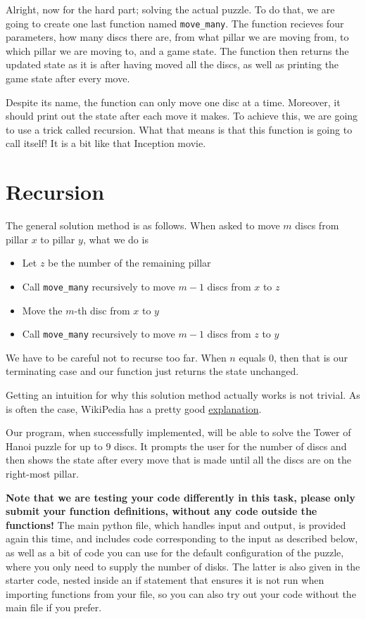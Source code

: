 
Alright, now for the hard part; solving the actual puzzle.
To do that, we are going to create one last function named \texttt{move\_many}.
The function recieves four parameters, how many discs there are,
from what pillar we are moving from, to which pillar we are moving to, and a game state.
The function then returns the updated state as it is after having moved all the discs,
as well as printing the game state after every move.

Despite its name, the function can only move one disc at a time.
Moreover, it should print out the state after each move it makes.
To achieve this, we are going to use a trick called recursion.
What that means is that this function is going to call itself!
It is a bit like that Inception movie.

\section*{Recursion}

The general solution method is as follows.
When asked to move $m$ discs from pillar $x$ to pillar $y$, what we do is
\begin{itemize}
    \item Let $z$ be the number of the remaining pillar
    \item Call \texttt{move\_many} recursively to move $m - 1$ discs from $x$ to $z$
    \item Move the $m$-th disc from $x$ to $y$
    \item Call \texttt{move\_many} recursively to move $m - 1$ discs from $z$ to $y$
\end{itemize}

We have to be careful not to recurse too far.
When $n$ equals $0$, then that is our terminating case and our function just returns the state unchanged.

Getting an intuition for why this solution method actually works is not trivial.
As is often the case, WikiPedia has a pretty good
\href{https://en.wikipedia.org/wiki/Tower\_of\_Hanoi#Recursive\_solution}{explanation}.

Our program, when successfully implemented, will be able to solve the Tower of Hanoi puzzle for up to $9$ discs.
It prompts the user for the number of discs
and then shows the state after every move that is made until all the discs are on the right-most pillar.

\textbf{Note that we are testing your code differently in this task,
please only submit your function definitions, without any code outside the functions!}
The main python file, which handles input and output, is provided again this time,
and includes code corresponding to the input as described below,
as well as a bit of code you can use for the default configuration of the puzzle,
where you only need to supply the number of disks.
The latter is also given in the starter code,
nested inside an if statement that ensures it is not run when importing functions from your file,
so you can also try out your code without the main file if you prefer.

